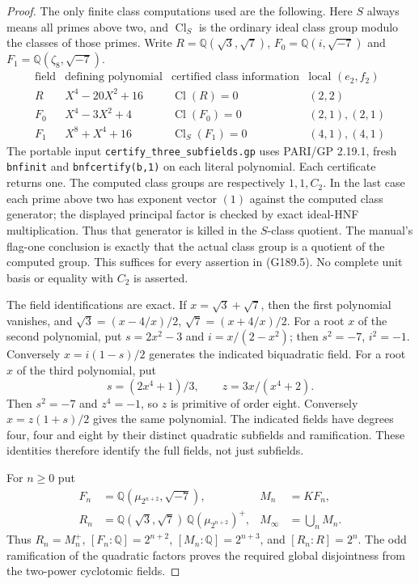 \begin{proof}
The only finite class computations used are the following.
Here $S$ always means all primes above two, and
$\operatorname{Cl}_S$ is the ordinary ideal class group modulo
the classes of those primes.
Write $R=\mathbb Q(\sqrt3,\sqrt7)$,
$F_0=\mathbb Q(i,\sqrt{-7})$ and
$F_1=\mathbb Q(\zeta_8,\sqrt{-7})$.
\[
\begin{array}{c|c|c|c}
\text{field}&\text{defining polynomial}&
 \text{certified class information}&\text{local }(e_2,f_2)\\ \hline
R&X^4-20X^2+16&\operatorname{Cl}(R)=0&(2,2)\\
F_0&X^4-3X^2+4&\operatorname{Cl}(F_0)=0&(2,1),(2,1)\\
F_1&X^8+X^4+16&\operatorname{Cl}_S(F_1)=0&(4,1),(4,1)
\end{array}
\tag{G189.5}
\]
The portable input \texttt{certify\_three\_subfields.gp} uses
PARI/GP 2.19.1, fresh \texttt{bnfinit} and
\texttt{bnfcertify(b,1)} on each literal polynomial.
Each certificate returns one.  The computed class groups are
respectively $1,1,C_2$.  In the last case each prime above two
has exponent vector $(1)$ against the computed class generator;
the displayed principal factor is checked by exact ideal-HNF
multiplication.  Thus that generator is killed in the $S$-class
quotient.  The manual's flag-one conclusion is exactly that the
actual class group is a quotient of the computed group.  This
suffices for every assertion in (G189.5).  No complete unit basis
or equality with $C_2$ is asserted.

The field identifications are exact.  If $x=\sqrt3+\sqrt7$, then
the first polynomial vanishes, and
$\sqrt3=(x-4/x)/2$, $\sqrt7=(x+4/x)/2$.
For a root $x$ of the second polynomial, put
$s=2x^2-3$ and $i=x/(2-x^2)$; then $s^2=-7$, $i^2=-1$.
Conversely $x=i(1-s)/2$ generates the indicated biquadratic field.
For a root $x$ of the third polynomial, put
\[
 s=(2x^4+1)/3,\qquad z=3x/(x^4+2).
\]
Then $s^2=-7$ and $z^4=-1$, so $z$ is primitive of order eight.
Conversely $x=z(1+s)/2$ gives the same polynomial.
The indicated fields have degrees four, four and eight by their
distinct quadratic subfields and ramification.  These identities
therefore identify the full fields, not just subfields.

For $n\geq0$ put
\[
 \begin{aligned}
 F_n&=\mathbb Q(\mu_{2^{n+2}},\sqrt{-7}),&
 M_n&=K F_n,\\
 R_n&=\mathbb Q(\sqrt3,\sqrt7)\,
                      \mathbb Q(\mu_{2^{n+2}})^+,&
 M_\infty&=\bigcup_n M_n.
 \end{aligned}\tag{G189.6}
\]
Thus $R_n=M_n^+$, $[F_n:\mathbb Q]=2^{n+2}$,
$[M_n:\mathbb Q]=2^{n+3}$, and $[R_n:R]=2^n$.
The odd ramification of the quadratic factors proves the required
global disjointness from the two-power cyclotomic fields.


\end{proof}
